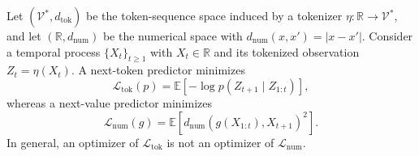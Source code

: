 \begin{proposition}
\label{prop:ntp_not_nvp}
Let $(\mathcal{V}^*, d_{\mathrm{tok}})$ be the token-sequence space induced by a
tokenizer $\eta:\mathbb{R}\rightarrow\mathcal{V}^*$, and let
$(\mathbb{R}, d_{\mathrm{num}})$ be the numerical space with
$d_{\mathrm{num}}(x,x')=|x-x'|$. Consider a temporal process
$\{X_t\}_{t\geq 1}$ with $X_t\in\mathbb{R}$ and its tokenized observation
$Z_t=\eta(X_t)$. A next-token predictor minimizes
\begin{equation}
    \mathcal{L}_{\mathrm{tok}}(p)
    =
    \mathbb{E}\left[-\log p(Z_{t+1}\mid Z_{1:t})\right],
\end{equation}
whereas a next-value predictor minimizes
\begin{equation}
    \mathcal{L}_{\mathrm{num}}(g)
    =
    \mathbb{E}\left[d_{\mathrm{num}}(g(X_{1:t}),X_{t+1})^2\right].
\end{equation}
In general, an optimizer of $\mathcal{L}_{\mathrm{tok}}$ is not an optimizer of
$\mathcal{L}_{\mathrm{num}}$.
\end{proposition}

